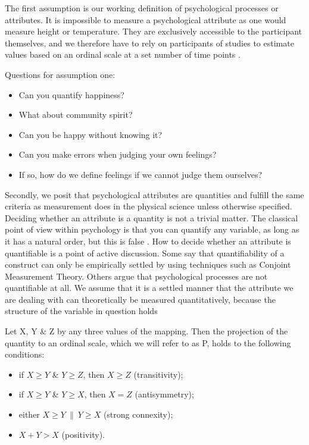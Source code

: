 \documentclass[utf8]{FrontiersinVancouver}
\begin{document}
The first assumption is our working definition of psychological processes or attributes. It is impossible to measure a psychological attribute as one would measure height or temperature. They are exclusively accessible to the participant themselves, and we therefore have to rely on participants of studies to estimate values based on an ordinal scale at a set number of time points \citep{friedWhatArePsychological2017, maraunAugustinianMethodologicalFamily2009}. 

\begin{framed} 
    Questions for assumption one:
    \begin{itemize}
        \item Can you quantify happiness?
        \item What about community spirit?
        \item Can you be happy without knowing it?
        \item Can you make errors when judging your own feelings?
        \item If so, how do we define feelings if we cannot judge them ourselves?
    \end{itemize}
\end{framed}

Secondly, we posit that psychological attributes are quantities and fulfill the same criteria as measurement does in the physical science unless otherwise specified. Deciding whether an attribute is a quantity is not a trivial matter. The classical point of view within psychology is that you can quantify any variable, as long as it has a natural order, but this is false \citep{luceSimultaneousConjointMeasurement1964,michellMeasurementPsychologyCritical1999,trendlerConjointMeasurementUndone2019, michellConjointMeasurementUnderdone2019,franzArePsychologicalAttributes2022, tafreshiSenseNonsensePsychological2022}. How to decide whether an attribute is quantifiable is a point of active discussion. Some say that quantifiability of a construct can only be empirically settled by using techniques such as Conjoint Measurement Theory. Others argue that psychological processes are not quantifiable at all. We assume that it is a settled manner that the attribute we are dealing with can theoretically be measured quantitatively, because the structure of the variable in question holds 


Let X, Y \& Z by any three values of the mapping. Then the projection of the quantity to an ordinal scale, which we will refer to as P, holds to the following conditions:
\begin{itemize}
    \item if $X \geq Y$ \& $Y \geq Z$, then $X \geq Z$ (transitivity);
    \item if $X \geq Y$ \& $Y \geq X$, then $X = Z$ (antisymmetry);
    \item either $X \geq Y\ \|\ Y \geq X$ (strong connexity);
    \item $X + Y > X$ (positivity).
\end{itemize}
\end{document}
